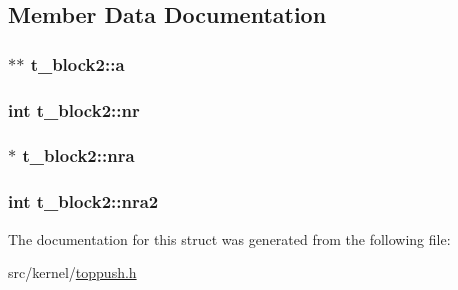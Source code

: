 \subsection{\-Member \-Data \-Documentation}
\hypertarget{structt__block2_a5b5950b2112bc7778dd8b979c961cee2}{
\subsubsection[{a}]{$\ast$$\ast$ {\bf t\-\_\-block2\-::a}}}\label{structt__block2_a5b5950b2112bc7778dd8b979c961cee2}
\hypertarget{structt__block2_a7494043acbaf5e286eaad414bc2668eb}{
\subsubsection[{nr}]{\setlength{\rightskip}{0pt plus 5cm}int {\bf t\-\_\-block2\-::nr}}}\label{structt__block2_a7494043acbaf5e286eaad414bc2668eb}
\hypertarget{structt__block2_aa721715b8e386b4da2def388ffdecf4a}{
\subsubsection[{nra}]{$\ast$ {\bf t\-\_\-block2\-::nra}}}\label{structt__block2_aa721715b8e386b4da2def388ffdecf4a}
\hypertarget{structt__block2_a4fb36e4a16aec69e9ca40d8d7f24cf18}{
\subsubsection[{nra2}]{\setlength{\rightskip}{0pt plus 5cm}int {\bf t\-\_\-block2\-::nra2}}}\label{structt__block2_a4fb36e4a16aec69e9ca40d8d7f24cf18}


\-The documentation for this struct was generated from the following file\-:\begin{DoxyCompactItemize}
\item 
src/kernel/\hyperlink{toppush_8h}{toppush.\-h}\end{DoxyCompactItemize}
